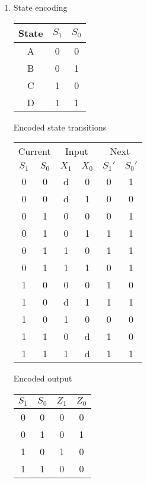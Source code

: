 \documentclass[12pt,letterpaper]{article}
\begin{document}
\begin{enumerate}
\begin{enumerate}
        \item
          State encoding

          \begin{tabular}{c | c c}
            State & $S_1$ & $S_0$ \\
            \hline
            A & 0 & 0 \\
            B & 0 & 1 \\
            C & 1 & 0 \\
            D & 1 & 1 \\
          \end{tabular}

          Encoded state transitions

          \begin{tabular}{c c | c c | c c}
            \multicolumn{2}{c}{Current} & \multicolumn{2}{|c|}{Input} & \multicolumn{2}{c}{Next}\\
            $S_1$ & $S_0$ & $X_1$ & $X_0$ & $S_1'$ & $S_0'$ \\
            \hline
            0 & 0 & d & 0 & 0 & 1 \\
            0 & 0 & d & 1 & 0 & 0 \\
            \hline
            0 & 1 & 0 & 0 & 0 & 1 \\
            0 & 1 & 0 & 1 & 1 & 1 \\
            0 & 1 & 1 & 0 & 1 & 1 \\
            0 & 1 & 1 & 1 & 0 & 1 \\
            \hline
            1 & 0 & 0 & 0 & 1 & 0 \\
            1 & 0 & d & 1 & 1 & 1 \\
            1 & 0 & 1 & 0 & 0 & 0 \\
            \hline
            1 & 1 & 0 & d & 1 & 0 \\
            1 & 1 & 1 & d & 1 & 1 \\
          \end{tabular}

          Encoded output

          \begin{tabular}{c c | c c}
            $S_1$ & $S_0$ & $Z_1$ & $Z_0$ \\
            \hline
            0 & 0 & 0 & 0 \\
            0 & 1 & 0 & 1 \\
            1 & 0 & 1 & 0 \\
            1 & 1 & 0 & 0 \\
          \end{tabular}


\end{enumerate}
\end{enumerate}
\end{document}

